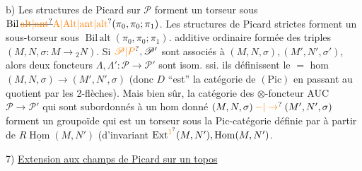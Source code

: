 b) Les structures de Picard  sur $\mathscr P$ forment un torseur sous $\operatorname{Bil}\deleted{\unsure{\mathrm{alt}|\mathrm{ant}}}\unsure{\mathrm{A}|\mathrm{Alt}|\mathrm{ant}|\mathrm{alt}}(\pi_0,\pi_0;\pi_1)$. Les structures de Picard strictes forment un sous-torseur sous $\operatorname{Bil\,alt}(\pi_0,\pi_0;\pi_1)$.
 additive ordinaire formée des triples $(M,N,\sigma\colon M\longrightarrow{}_2N)$. Si $\unsure{\mathscr P|P},\mathscr P'$ sont associés à $(M,N,\sigma),(M',N',\sigma')$, alors deux foncteurs $\Lambda,\Lambda'\colon\mathscr P\longrightarrow\mathscr P'$ sont isom. ssi. ils définissent le $=$ hom $(M,N,\sigma)\longrightarrow(M',N',\sigma)$ (donc $D$ ``est'' la catégorie  de $(\mathrm{Pic})$ en passant au quotient par les 2-flèches).
Mais bien sûr, la catégorie des $\otimes$-foncteur AUC $\mathscr P\longrightarrow\mathscr P'$ qui sont subordonnés à un hom donné $(M,N,\sigma)\mathbin{\unsure{-|\to}}(M',N',\sigma)$ forment un groupoïde qui est un torseur sous la Pic-catégorie définie par  à partir de $R\underline{\operatorname{Hom}}(M,N')$ (d'invariant $\operatorname{Ext}^{\unsure{1}}(M,N'),\operatorname{Hom}(M,N')$.

7)  \uline{Extension aux champs de Picard sur un topos}

